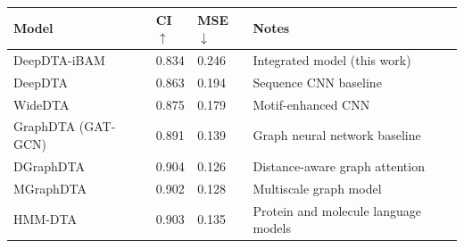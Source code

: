\begin{tabular}{llll}
\toprule
Model & CI$\uparrow$ & MSE$\downarrow$ & Notes \\
\midrule
DeepDTA-iBAM & 0.834 & 0.246 & Integrated model (this work) \\
DeepDTA & 0.863 & 0.194 & Sequence CNN baseline \\
WideDTA & 0.875 & 0.179 & Motif-enhanced CNN \\
GraphDTA (GAT-GCN) & 0.891 & 0.139 & Graph neural network baseline \\
DGraphDTA & 0.904 & 0.126 & Distance-aware graph attention \\
MGraphDTA & 0.902 & 0.128 & Multiscale graph model \\
HMM-DTA & 0.903 & 0.135 & Protein and molecule language models \\
\bottomrule
\end{tabular}
